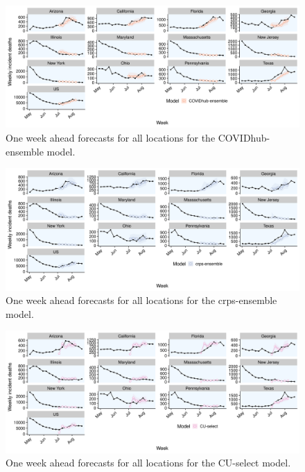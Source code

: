 \documentclass[
]{book}
\begin{document}
\begin{figure}
\includegraphics[width=1\linewidth]{../visualisation/chapter-5-results/scenario-baseline/APPENDIX-COVIDhub-ensemble-forecasts} \caption{One week ahead forecasts for all locations for the COVIDhub-ensemble model.}\label{fig:predictions-covid-ensembe}
\end{figure}

\begin{figure}
\includegraphics[width=1\linewidth]{../visualisation/chapter-5-results/scenario-baseline/APPENDIX-crps-ensemble-forecasts} \caption{One week ahead forecasts for all locations for the crps-ensemble model.}\label{fig:predictions-crps}
\end{figure}

\begin{figure}
\includegraphics[width=1\linewidth]{../visualisation/chapter-5-results/scenario-baseline/APPENDIX-CU-select-forecasts} \caption{One week ahead forecasts for all locations for the CU-select model.}\label{fig:predictions-cu-select}
\end{figure}
\end{document}

